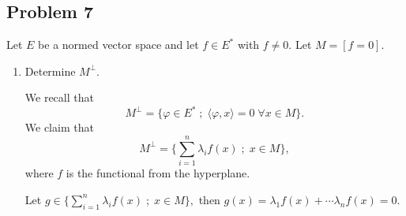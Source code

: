 \documentclass[11pt]{article}
\begin{document}
\begin{problem}
\begin{enumerate}
\newpage
\section*{Problem 7}
\begin{problem}
Let $E $ be a normed vector space and let $f\in E^*$ with $f\neq 0.$ Let $M = [f = 0].$
    \begin{enumerate}
    \item Determine $M^\perp$.
    \begin{solution}
        We recall that 
        \[M^\perp = \{\varphi \in E^* \; ; \; \langle \varphi , x\rangle = 0 \; \forall x\in M\}.\] We claim that
        \[M^\perp = \{\sum_{i=1}^n \lambda_i f(x)\;;\; x\in M\},\] where $f$ is the functional from the hyperplane.

        Let $g\in \{\sum_{i=1}^n \lambda_i f(x)\;;\; x\in M\},$ then $g(x) = \lambda_1f(x) + \cdots \lambda_n f(x) = 0.$


\end{solution}
\end{enumerate}
\end{problem}
\end{enumerate}
\end{problem}
\end{document}
